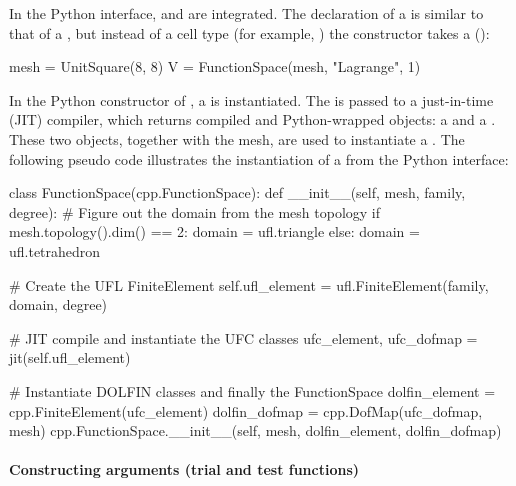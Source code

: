 In the Python interface,  and
 are integrated. The declaration of a
 is similar to that of a ,
but instead of a cell type (for example, ) the
 constructor takes a  ():
\begin{python}
mesh = UnitSquare(8, 8)
V = FunctionSpace(mesh, "Lagrange", 1)
\end{python}
In the Python constructor of , a
 is instantiated. The 
is passed to a just-in-time (JIT) compiler, which returns compiled
and Python-wrapped  objects: a 
and a . These two objects, together with the mesh,
are used to instantiate a . The following pseudo
code illustrates the instantiation of a  from the
Python interface:
\begin{python}
class FunctionSpace(cpp.FunctionSpace):
    def __init__(self, mesh, family, degree):
        # Figure out the domain from the mesh topology
        if mesh.topology().dim() == 2:
            domain = ufl.triangle
        else:
            domain = ufl.tetrahedron

        # Create the UFL FiniteElement
        self.ufl_element = ufl.FiniteElement(family, domain, degree)

        # JIT compile and instantiate the UFC classes
        ufc_element, ufc_dofmap = jit(self.ufl_element)

        # Instantiate DOLFIN classes and finally the FunctionSpace
        dolfin_element = cpp.FiniteElement(ufc_element)
        dolfin_dofmap = cpp.DofMap(ufc_dofmap, mesh)
        cpp.FunctionSpace.__init__(self, mesh, dolfin_element, dolfin_dofmap)
\end{python}


\paragraph{Constructing arguments (trial and test functions)}

